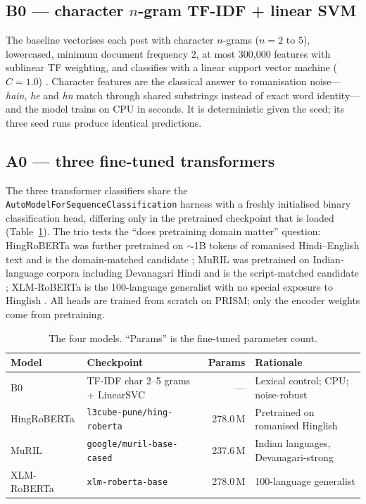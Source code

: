 \subsection{B0 --- character $n$-gram TF-IDF + linear SVM}
The baseline vectorises each post with character $n$-grams ($n = 2$ to 5),
lowercased, minimum document frequency 2, at most 300{,}000 features with
sublinear TF weighting, and classifies with a linear support vector machine
($C = 1.0$) \cite{sklearn}. Character features are the classical answer to
romanisation noise---\emph{hain}, \emph{he} and \emph{hn} match through shared
substrings instead of exact word identity---and the model trains on CPU in
seconds. It is deterministic given the seed; its three seed runs produce
identical predictions.

\subsection{A0 --- three fine-tuned transformers}
The three transformer classifiers share the \texttt{AutoModelForSequenceClassification}
harness with a freshly initialised binary classification head, differing only in
the pretrained checkpoint that is loaded
(Table~\ref{tab:models}). The trio tests the ``does pretraining domain matter''
question: HingRoBERTa was further pretrained on $\sim$1B tokens of romanised
Hindi--English text and is the domain-matched candidate \cite{hingroberta,nayak2022};
MuRIL was pretrained on Indian-language corpora including Devanagari Hindi and is
the script-matched candidate \cite{muril}; XLM-RoBERTa is the 100-language
generalist with no special exposure to Hinglish \cite{xlmr}. All heads are trained
from scratch on PRISM; only the encoder weights come from pretraining.

\begin{table}[htbp]
\centering
\caption[The four models and their parameter counts]{The four models. ``Params'' is the fine-tuned parameter count.}
\label{tab:models}
\small
\begin{tabular}{p{2.6cm}p{4.6cm}rp{3.4cm}}
\toprule
Model & Checkpoint & Params & Rationale \\
\midrule
B0 & TF-IDF char 2--5 grams + LinearSVC & --- & Lexical control; CPU; noise-robust \\
HingRoBERTa & \texttt{l3cube-pune/hing-roberta} & 278.0\,M & Pretrained on romanised Hinglish \\
MuRIL & \texttt{google/muril-base-cased} & 237.6\,M & Indian languages, Devanagari-strong \\
XLM-RoBERTa & \texttt{xlm-roberta-base} & 278.0\,M & 100-language generalist \\
\bottomrule
\end{tabular}
\end{table}


